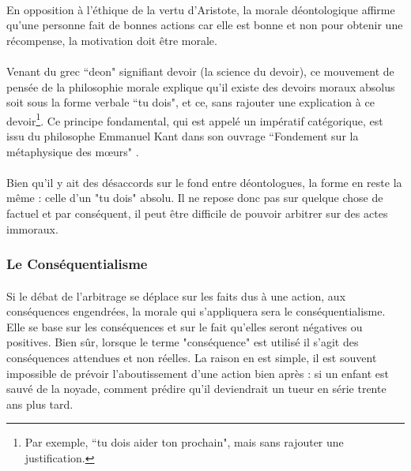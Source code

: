 \documentclass[10pt, french, a4paper]{report}
\begin{document}
\paragraph{}
En opposition à l'éthique de la vertu d'Aristote, la morale déontologique affirme qu'une personne fait de bonnes actions car elle est bonne et non pour obtenir une récompense, la motivation doit être morale.

\paragraph{}
Venant du grec ``deon" signifiant devoir (la science du devoir), ce mouvement de pensée de la philosophie morale explique qu’il existe des devoirs moraux absolus soit sous la forme verbale ``tu dois", et ce, sans rajouter une explication à ce devoir\footnote{Par exemple, ``tu dois aider ton prochain", mais sans rajouter une justification.}. Ce principe fondamental, qui est appelé un impératif catégorique, est issu du philosophe Emmanuel Kant dans son ouvrage ``Fondement sur la métaphysique des mœurs" \citep{kant_fondements_2007}.

\paragraph{}
Bien qu’il y ait des désaccords sur le fond entre déontologues, la forme en reste la même : celle d’un "tu dois" absolu. Il ne repose donc pas sur quelque chose de factuel et par conséquent, il peut être difficile de pouvoir arbitrer sur des actes immoraux.

\subsubsection{Le Conséquentialisme}

\paragraph{}
Si le débat de l’arbitrage se déplace sur les faits dus à une action, aux conséquences engendrées, la morale qui s’appliquera sera le conséquentialisme. Elle se base sur les conséquences et sur le fait qu’elles seront négatives ou positives. Bien sûr, lorsque le terme "conséquence" est utilisé il s’agit des conséquences attendues et non réelles. La raison en est simple, il est souvent impossible de prévoir l’aboutissement d’une action bien après : si un enfant est sauvé de la noyade, comment prédire qu’il deviendrait un tueur en série trente ans plus tard.
\end{document}
